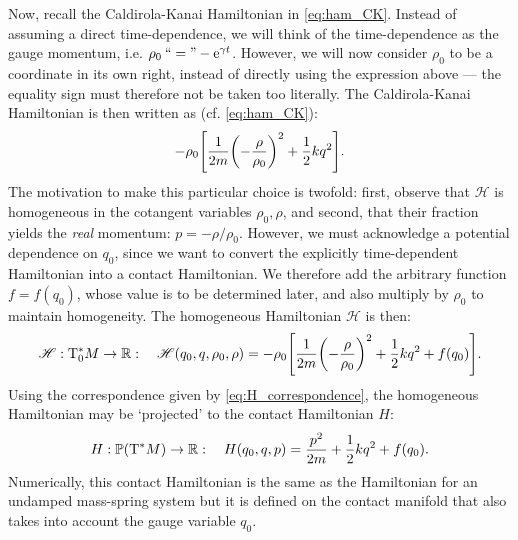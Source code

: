 Now, recall the Caldirola-Kanai Hamiltonian in \cref{eq:ham_CK}. Instead of assuming a direct time-dependence, we will think of the time-dependence as the gauge momentum, i.e. $\rho_0 \:``=" -\mathrm{e}^{\gamma t}$. However, we will now consider $\rho_0$ to be a coordinate in its own right, instead of directly using the expression above --- the equality sign must therefore not be taken too literally. The Caldirola-Kanai Hamiltonian is then written as (cf. \cref{eq:ham_CK}):
$$ -\rho_0 \qty[\frac{1}{2m}\qty(-\frac{\rho}{\rho_0})^2 + \frac{1}{2}kq^2]. $$
The motivation to make this particular choice is twofold: first, observe that $\mathscr{H}$ is homogeneous in the cotangent variables $\rho_0, \rho$, and second, that their fraction yields the \emph{real} momentum: $ p = -\rho/\rho_0 $. However, we must acknowledge a potential dependence on $q_0$, since we want to convert the explicitly time-dependent Hamiltonian into a contact Hamiltonian. We therefore add the arbitrary function $f = f(q_0)$, whose value is to be determined later, and also multiply by $\rho_0$ to maintain homogeneity. The homogeneous Hamiltonian $\mathscr{H}$ is then:
\begin{equation}
    \mathscr{H}: \mathrm{T}^*_0M \to \mathbb{R}: \quad \mathscr{H}(q_0, q, \rho_0, \rho) = -\rho_0 \qty[\frac{1}{2m}\qty(-\frac{\rho}{\rho_0})^2 + \frac{1}{2}kq^2 + f(q_0)]. 
    \label{eq:homo_hck}
\end{equation}
 Using the correspondence given by \cref{eq:H_correspondence}, the homogeneous Hamiltonian may be `projected' to the contact Hamiltonian $H$:
\begin{equation}
    H: \mathbb{P}\qty(\mathrm{T}^*M) \to \mathbb{R}: \quad H(q_0, q, p) = \frac{p^2}{2m} + \frac{1}{2}kq^2 + f(q_0).
\end{equation}
Numerically, this contact Hamiltonian is the same as the Hamiltonian for an undamped mass-spring system but it is defined on the contact manifold that also takes into account the gauge variable $q_0$.

